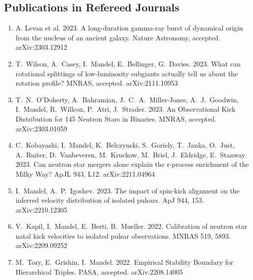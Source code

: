\documentclass[margin,line]{res}
\begin{document}
\begin{resume}

\newpage

\section{\sc Publications in Refereed Journals}

\begin{enumerate}

\item A. Levan et al. 2023.  A long-duration gamma-ray burst of dynamical origin from the nucleus of an ancient galaxy.  Nature Astronomy, accepted. arXiv:2303.12912

\item T.~Wilson, A.~Casey, I.~Mandel, E.~Bellinger, G.~Davies.  2023.  What can rotational splittings of low-luminosity subgiants actually tell us about the rotation profile?  MNRAS, accepted.  arXiv:2111.10953

\item T.~N.~O'Doherty, A.~Bahramian, J.~C.~A.~Miller-Jones, A.~J.~Goodwin, I.~Mandel, R.~Willcox, P.~Atri, J.~Strader.  2023.  An Observational Kick Distribution for 145 Neutron Stars in Binaries.  MNRAS, accepted.   arXiv:2303.01059

\item C.~Kobayashi, I.~Mandel, K.~Belczynski, S.~Goriely, T.~Janka, O.~Just, A.~Ruiter, D.~Vanbeveren, M.~Kruckow, M.~Briel, J.~Eldridge, E.~Stanway.  2023.  Can neutron star mergers alone explain the r-process enrichment of the Milky Way?    ApJL 943, L12.  arXiv:2211.04964

\item I.~Mandel, A.~P.~Igoshev.  2023.  The impact of spin-kick alignment on the inferred velocity distribution of isolated pulsars.  ApJ 944, 153. arXiv:2210.12305

\item V.~Kapil, I.~Mandel, E.~Berti, B.~Mueller.  2022.  Calibration of neutron star natal kick velocities to isolated pulsar observations. MNRAS 519, 5893.  arXiv:2209.09252

\item M.~Tory, E.~Grishin, I.~Mandel. 2022. Empirical Stability Boundary for Hierarchical Triples. PASA, accepted.  arXiv:2208.14005


\end{enumerate}
\end{resume}
\end{document}

